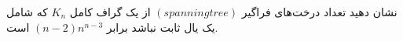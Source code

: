     \p 
نشان دهید تعداد درخت‌های فراگیر
$(spanning tree)$
از یک گراف کامل
$K_n$
که شامل یک یال ثابت نباشد برابر
$(n - 2)n^{n-3}$
است.